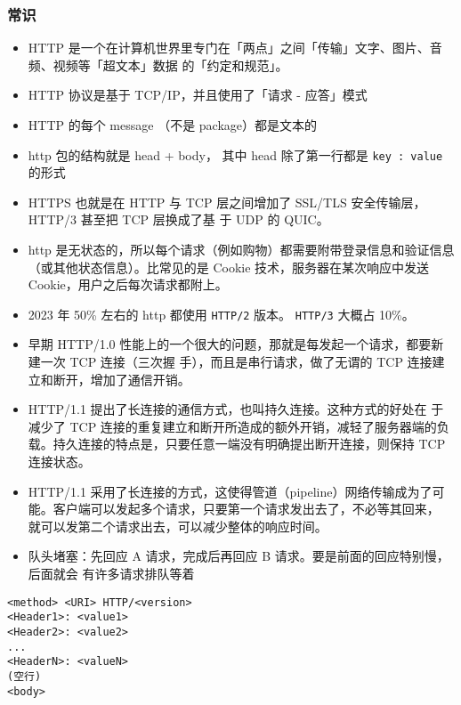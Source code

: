 
\begin{issues}
\issueDraft
\end{issues}

\subsubsection{常识}
\begin{itemize}
\item HTTP 是一个在计算机世界里专门在「两点」之间「传输」文字、图片、音频、视频等「超文本」数据 的「约定和规范」。
\item HTTP 协议是基于  TCP/IP，并且使用了「请求 - 应答」模式
\item HTTP 的每个 message （不是 package）都是文本的
\item http 包的结构就是 head + body， 其中 head 除了第一行都是 \verb`key : value` 的形式
\item HTTPS 也就是在 HTTP 与 TCP 层之间增加了 SSL/TLS 安全传输层，HTTP/3 甚至把 TCP 层换成了基 于 UDP 的 QUIC。
\item http 是无状态的，所以每个请求（例如购物）都需要附带登录信息和验证信息（或其他状态信息）。比常见的是 Cookie 技术，服务器在某次响应中发送 Cookie，用户之后每次请求都附上。
\item 2023 年 50\% 左右的 http 都使用 \verb`HTTP/2` 版本。 \verb`HTTP/3` 大概占 10\%。
\end{itemize}


\begin{itemize}
\item 早期 HTTP/1.0 性能上的一个很大的问题，那就是每发起一个请求，都要新建一次 TCP 连接（三次握 手），而且是串行请求，做了无谓的 TCP 连接建立和断开，增加了通信开销。
\item HTTP/1.1 提出了长连接的通信方式，也叫持久连接。这种方式的好处在 于减少了 TCP 连接的重复建立和断开所造成的额外开销，减轻了服务器端的负载。持久连接的特点是，只要任意一端没有明确提出断开连接，则保持 TCP 连接状态。
\item HTTP/1.1 采用了长连接的方式，这使得管道（pipeline）网络传输成为了可能。客户端可以发起多个请求，只要第一个请求发出去了，不必等其回来， 就可以发第二个请求出去，可以减少整体的响应时间。
\item 队头堵塞：先回应 A 请求，完成后再回应 B 请求。要是前面的回应特别慢，后面就会 有许多请求排队等着
\end{itemize}

\begin{lstlisting}[language=none]
<method> <URI> HTTP/<version>
<Header1>: <value1>
<Header2>: <value2>
...
<HeaderN>: <valueN>
(空行)
<body>
\end{lstlisting}

